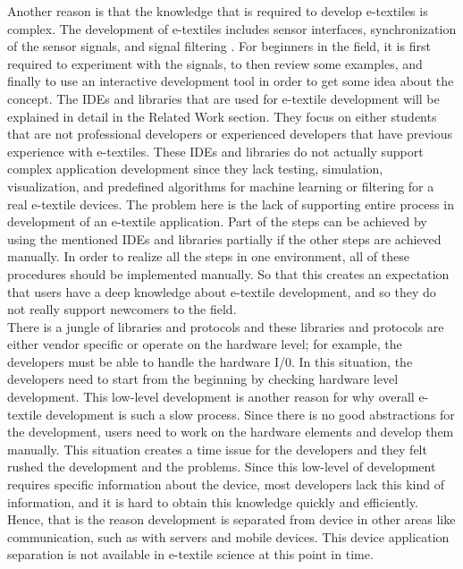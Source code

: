 	 Another reason is that the knowledge that is required to develop e-textiles is complex. The development of e-textiles includes sensor interfaces, synchronization of the sensor signals, and signal filtering \cite{8}. For beginners in the field, it is first required to experiment with the signals, to then review some examples, and finally to use an interactive development tool in order to get some idea about the concept. The IDEs and libraries that are used for e-textile development will be explained in detail in the Related Work section. They focus on either students that are not professional developers or experienced developers that have previous experience with e-textiles. These IDEs and libraries do not actually support complex application development since they lack testing, simulation, visualization, and predefined algorithms for machine learning or filtering for a real e-textile devices. The problem here is the lack of supporting entire process in development of an e-textile application. Part of the steps can be achieved by using the mentioned IDEs and libraries partially if the other steps are achieved manually. In order to realize all the steps in one environment, all of these procedures should be implemented manually. So that this creates an expectation that users have a deep knowledge about e-textile development, and so they do not really support newcomers to the field.  \\	
	
There is a jungle of libraries and protocols and these libraries and protocols are either vendor specific or operate on the hardware level; for example, the developers must be able to handle the hardware I/0. In this situation, the developers need to start from the beginning by checking hardware level development. This low-level development is another reason for why overall e-textile development is such a slow process. Since there is no good abstractions for the development, users need to work on the hardware elements and develop them manually. This situation creates a time issue for the developers and they felt rushed the development and the problems. Since this low-level of development requires specific information about the device, most developers lack this kind of information, and it is hard to obtain this knowledge quickly and efficiently. Hence, that is the reason development is separated from device in other areas like communication, such as with servers and mobile devices. This device application separation is not available in e-textile science at this point in time.  	\\
	
